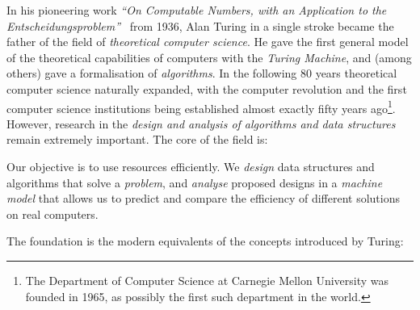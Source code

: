 In his pioneering work \emph{``On Computable Numbers, with an Application to the Entscheidungsproblem''}~\cite{turing1936computable} from 1936, Alan Turing in a single stroke became the father of the field of \emph{theoretical computer science}. He gave the first general model of the theoretical capabilities of computers with the \emph{Turing Machine}, and (among others) gave a formalisation of \emph{algorithms}.
In the following 80 years theoretical computer science naturally expanded, with the computer revolution and the first computer science institutions being established almost exactly fifty years ago\footnote{The Department of Computer Science at Carnegie Mellon University was founded in 1965, as possibly the first such department in the world.}. 
However, research in the \emph{design and analysis of algorithms and data structures} remain extremely important. The core of the field is:


\begin{framed}
\noindent Our objective is to use resources efficiently. We \emph{design} data structures and algorithms that solve a \emph{problem}, and \emph{analyse} proposed designs in a \emph{machine model} that allows us to predict and compare the efficiency of different solutions on real computers.
\end{framed}

\noindent The foundation is the modern equivalents of the concepts introduced by Turing:


